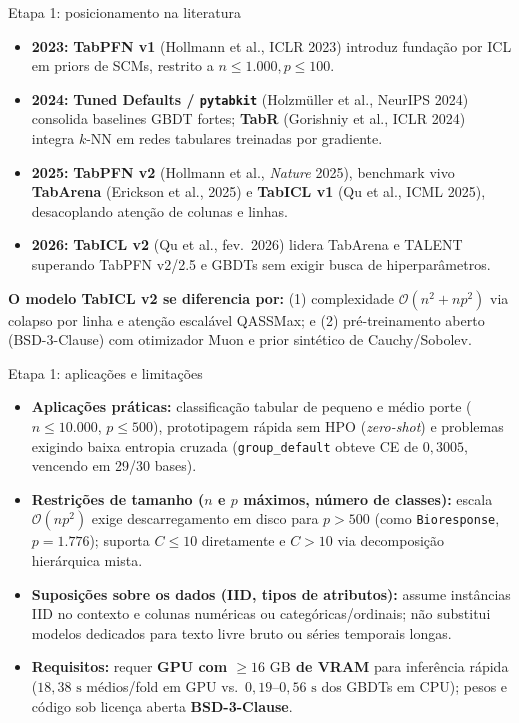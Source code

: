 \documentclass[aspectratio=169,11pt]{beamer}
\begin{document}
\begin{frame}{Etapa 1: posicionamento na literatura}
    \small
    \begin{itemize}
        \setlength{\itemsep}{2pt}
        \item \textbf{2023:} \textbf{TabPFN v1} (Hollmann et al., ICLR 2023) introduz fundação por ICL em priors de SCMs, restrito a $n \le 1.000, p \le 100$.
        \item \textbf{2024:} \textbf{Tuned Defaults / \texttt{pytabkit}} (Holzmüller et al., NeurIPS 2024) consolida baselines GBDT fortes; \textbf{TabR} (Gorishniy et al., ICLR 2024) integra $k$-NN em redes tabulares treinadas por gradiente.
        \item \textbf{2025:} \textbf{TabPFN v2} (Hollmann et al., \textit{Nature} 2025), benchmark vivo \textbf{TabArena} (Erickson et al., 2025) e \textbf{TabICL v1} (Qu et al., ICML 2025), desacoplando atenção de colunas e linhas.
        \item \textbf{2026:} \textbf{TabICL v2} (Qu et al., fev.\ 2026) lidera TabArena e TALENT superando TabPFN v2/2.5 e GBDTs sem exigir busca de hiperparâmetros.
    \end{itemize}
    \vspace{0.2em}
    \footnotesize \textbf{O modelo TabICL v2 se diferencia por:} (1) complexidade $\mathcal{O}(n^2 + n p^2)$ via colapso por linha e atenção escalável QASSMax; e (2) pré-treinamento aberto (BSD-3-Clause) com otimizador Muon e prior sintético de Cauchy/Sobolev.
\end{frame}

\begin{frame}{Etapa 1: aplicações e limitações}
    \small
    \begin{itemize}
        \setlength{\itemsep}{2pt}
        \item \textbf{Aplicações práticas:} classificação tabular de pequeno e médio porte ($n \le 10.000$, $p \le 500$), prototipagem rápida sem HPO (\textit{zero-shot}) e problemas exigindo baixa entropia cruzada (\texttt{group\_default} obteve CE de $0{,}3005$, vencendo em 29/30 bases).
        \item \textbf{Restrições de tamanho ($n$ e $p$ máximos, número de classes):} escala $\mathcal{O}(n p^2)$ exige descarregamento em disco para $p > 500$ (como \texttt{Bioresponse}, $p=1.776$); suporta $C \le 10$ diretamente e $C > 10$ via decomposição hierárquica mista.
        \item \textbf{Suposições sobre os dados (IID, tipos de atributos):} assume instâncias IID no contexto e colunas numéricas ou categóricas/ordinais; não substitui modelos dedicados para texto livre bruto ou séries temporais longas.
        \item \textbf{Requisitos:} requer \textbf{GPU com $\ge 16\text{ GB}$ de VRAM} para inferência rápida ($18{,}38\text{ s}$ médios/fold em GPU vs.\ $0{,}19\text{--}0{,}56\text{ s}$ dos GBDTs em CPU); pesos e código sob licença aberta \textbf{BSD-3-Clause}.
    \end{itemize}
\end{frame}
\end{document}
